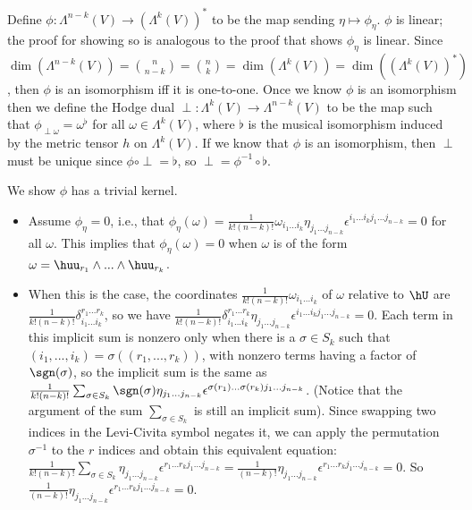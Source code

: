 \begin{itemize}
\begin{itemize}
		Define $\phi:\Lambda^{n - k}(V) \rightarrow (\Lambda^k(V))^*$ to be the map sending $\eta \mapsto \phi_\eta$. $\phi$ is linear; the proof for showing so is analogous to the proof that shows $\phi_\eta$ is linear. Since $\dim(\Lambda^{n - k}(V)) = \binom{n}{n - k} = \binom{n}{k} = \dim(\Lambda^k(V)) = \dim((\Lambda^k(V))^*)$, then $\phi$ is an isomorphism iff it is one-to-one. Once we know $\phi$ is an isomorphism then we define the Hodge dual $\perp:\Lambda^k(V) \rightarrow \Lambda^{n - k}(V)$ to be the map such that $\phi_{\perp \omega} = \omega^\flat$ for all $\omega \in \Lambda^k(V)$, where $\flat$ is the musical isomorphism induced by the metric tensor $h$ on $\Lambda^k(V)$. If we know that $\phi$ is an isomorphism, then $\perp$ must be unique since $\phi \circ \perp = \flat$, so $\perp = \phi^{-1} \circ \flat$.
		
		We show $\phi$ has a trivial kernel.
		\begin{itemize}
			\item Assume $\phi_\eta = 0$, i.e., that $\phi_\eta(\omega) = \frac{1}{k!(n - k)!} \omega_{i_1 ... i_k} \eta_{j_1 ... j_{n - k}} \epsilon^{i_1 ... i_k j_1 ... j_{n - k}} = 0$ for all $\omega$. This implies that $\phi_\eta(\omega) = 0$ when $\omega$ is of the form $\omega = \huu_{r_1} \wedge ... \wedge \huu_{r_k}$.
			
			\item When this is the case, the coordinates $\frac{1}{k!(n - k)!} \omega_{{i_1}...{i_k}}$ of $\omega$ relative to $\hU$ are $\frac{1}{k!(n - k)!} \delta^{r_1 ... r_k}_{i_1 ... i_k}$, so we have $\frac{1}{k!(n - k)!} \delta^{r_1 ... r_k}_{i_1 ... i_k} \eta_{j_1 ... j_{n - k}} \epsilon^{i_1 ... i_k j_1 ... j_{n - k}} = 0$. Each term in this implicit sum is nonzero only when there is a $\sigma \in S_k$ such that $(i_1, ..., i_k) = \sigma((r_1, ..., r_k))$, with nonzero terms having a factor of $\sgn(\sigma)$, so the implicit sum is the same as $\frac{1}{k!(n - k)!} \sum_{\sigma \in S_k} \sgn(\sigma) \eta_{j_1 ... j_{n - k}} \epsilon^{\sigma(r_1) ... \sigma(r_k) j_1 ... j_{n - k}}$. (Notice that the argument of the sum $\sum_{\sigma \in S_k}$ is still an implicit sum). Since swapping two indices in the Levi-Civita symbol negates it, we can apply the permutation $\sigma^{-1}$ to the $r$ indices and obtain this equivalent equation: $\frac{1}{k!(n - k)!} \sum_{\sigma \in S_k} \eta_{j_1 ... j_{n - k}} \epsilon^{r_1 ... r_k j_1 ... j_{n - k}} = \frac{1}{(n - k)!} \eta_{j_1 ... j_{n - k}} \epsilon^{r_1 ... r_k j_1 ... j_{n - k}} = 0$. So $\frac{1}{(n - k)!} \eta_{j_1 ... j_{n - k}} \epsilon^{r_1 ... r_k j_1 ... j_{n - k}} = 0$.
			

\end{itemize}
\end{itemize}
\end{itemize}
